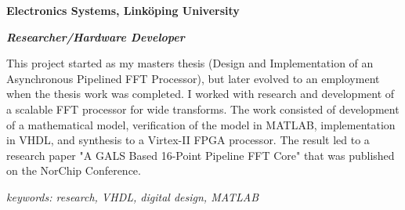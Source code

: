 \item[2002-2003] \textbf{Electronics Systems, Linköping University}

\textit{\textbf{Researcher/Hardware Developer}}

This project started as my masters thesis (Design and Implementation of an Asynchronous Pipelined FFT Processor), but later evolved to an employment when the thesis work was completed. I worked with research and development of a scalable FFT processor for wide transforms. The work consisted of development of a mathematical model, verification of the model in MATLAB, implementation in VHDL, and synthesis to a Virtex-II FPGA processor. The result led to a research paper "A GALS Based 16-Point Pipeline FFT Core" that was published on the NorChip Conference.

\textit{keywords: research, VHDL, digital design, MATLAB}